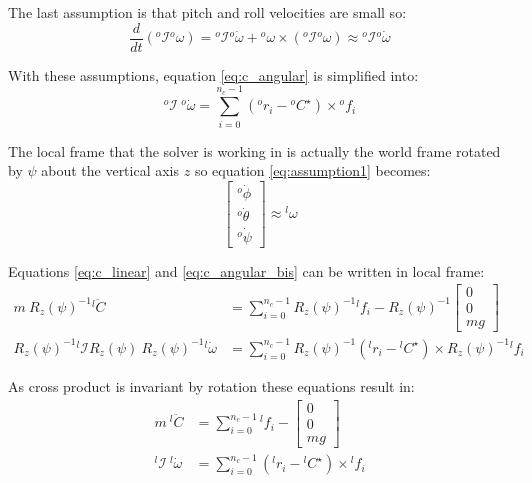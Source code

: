\documentclass[a4paper,11pt]{article}
\begin{document}
The last assumption is that pitch and roll velocities are small so:
\begin{equation}
	\frac{d}{dt}({}^o\!\mathcal{I} {}^o\!\omega) = {}^o\!\mathcal{I} {}^o\! \dot \omega + {}^o\! \omega \times ({}^o\!\mathcal{I} {}^o\! \omega) \approx {}^o\!\mathcal{I} {}^o\! \dot \omega
\end{equation}

With these assumptions, equation \ref{eq:c_angular} is simplified into:
\begin{equation}
{}^o\!\mathcal{I} ~ {}^o\! \dot \omega = \sum_{i=0}^{n_c - 1} ({}^o\!r_i - {}^o\!C^\star) \times {}^o\!f_i \label{eq:c_angular_bis}
\end{equation}

The local frame that the solver is working in is actually the world frame rotated by $\psi$ about the vertical axis $z$ so equation \ref{eq:assumption1} becomes:
\begin{equation}
\begin{bmatrix} {}^o\! \dot \phi \\ {}^o\! \dot \theta \\ {}^o\! \dot \psi \end{bmatrix} \approx {}^l\!\omega 
\end{equation}

Equations \ref{eq:c_linear} and \ref{eq:c_angular_bis} can be written in local frame:
\begin{align}
m ~ R_z(\psi)^{-1} {}^l\!  \ddot C &= \sum_{i=0}^{n_c - 1} R_z(\psi)^{-1} {}^l\!f_i - R_z(\psi)^{-1} \begin{bmatrix} 0 \\ 0 \\ mg \end{bmatrix} \\
R_z(\psi)^{-1} {}^l\!\mathcal{I} R_z(\psi) ~ R_z(\psi)^{-1} {}^l\! \dot \omega &= \sum_{i=0}^{n_c - 1} R_z(\psi)^{-1} ({}^l\!r_i - {}^l\!C^\star) \times R_z(\psi)^{-1} {}^l\!f_i
\end{align}

As cross product is invariant by rotation these equations result in:
\begin{align}
m ~ {}^l\!  \ddot C &= \sum_{i=0}^{n_c - 1} {}^l\!f_i - \begin{bmatrix} 0 \\ 0 \\ mg \end{bmatrix} \\
{}^l\!\mathcal{I} ~ {}^l\! \dot \omega &= \sum_{i=0}^{n_c - 1} ({}^l\!r_i - {}^l\!C^\star) \times {}^l\!f_i
\end{align}
\end{document}

